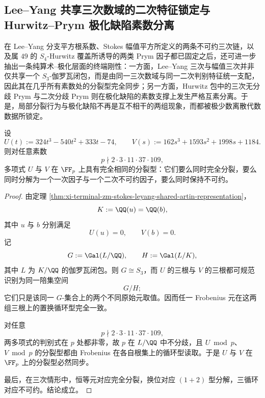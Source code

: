 \subsection{Lee--Yang 共享三次数域的二次特征锁定与 Hurwitz--Prym 极化缺陷素数分离}\label{subsec:conclusion-leyang-shared-cubic-character-prym-prime-separation}

在 Lee--Yang 分支平方根系数、Stokes 幅值平方所定义的两条不可约三次链，以及属 \(49\) 的 \(S_4\)-Hurwitz 覆盖所诱导的两类 Prym 因子都已固定之后，还可进一步抽出一条纯算术--极化层面的终端刚性：一方面，Lee--Yang 三次与幅值三次并非仅共享一个 \(S_3\)-伽罗瓦闭包，而是由同一三次数域与同一二次判别特征统一支配，因此其在几乎所有素数处的分裂型完全同步；另一方面，Hurwitz 包中的三次无分歧 Prym 与二次分歧 Prym 则在极化缺陷的素数支撑上发生严格互素分离。于是，局部分裂行为与极化缺陷不再是互不相干的两组现象，而都被极少数离散代数数据所锁定。

\begin{theorem}\label{thm:conclusion-leyang-stokes-cubic-splitting-synchrony}
设
\[
U(t):=324t^3-540t^2+333t-74,
\qquad
V(s):=162s^3+1593s^2+1998s+1184.
\]
则对任意素数
\[
p\nmid 2\cdot 3\cdot 11\cdot 37\cdot 109,
\]
多项式 \(U\) 与 \(V\) 在 \(\FF_p\) 上具有完全相同的分裂型：它们要么同时完全分裂，要么同时分解为一个一次因子与一个二次不可约因子，要么同时保持不可约。
\end{theorem}
\begin{proof}
由定理 \ref{thm:xi-terminal-zm-stokes-leyang-shared-artin-representation}，
\[
K:=\QQ(u)=\QQ(b),
\]
其中 \(u\) 与 \(b\) 分别满足
\[
U(u)=0,
\qquad
V(b)=0.
\]
记
\[
G:=\Gal(L/\QQ),
\qquad
H:=\Gal(L/K),
\]
其中 \(L\) 为 \(K/\QQ\) 的伽罗瓦闭包。则 \(G\cong S_3\)，而 \(U\) 的三根与 \(V\) 的三根都可规范识别为同一陪集空间
\[
G/H;
\]
它们只是该同一 \(G\)-集合上的两个不同原始元取值。因而任一 Frobenius 元在这两组三根上的置换循环型完全一致。

对任意
\[
p\nmid 2\cdot 3\cdot 11\cdot 37\cdot 109,
\]
两多项式的判别式在 \(p\) 处都非零，故 \(p\) 在 \(L/\QQ\) 中不分歧，且 \(U\bmod p\)、\(V\bmod p\) 的分裂型都由 Frobenius 在各自根集上的循环型读取。于是 \(U\) 与 \(V\) 在 \(\FF_p\) 上的分裂型必然同步。

最后，在三次情形中，恒等元对应完全分裂，换位对应 \((1+2)\) 型分解，三循环对应不可约。结论成立。
\end{proof}

